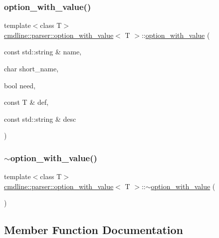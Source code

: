 \subsubsection{\texorpdfstring{option\_with\_value()}{option\_with\_value()}}
{\footnotesize\ttfamily template$<$class T$>$ \\
\mbox{\hyperlink{classcmdline_1_1parser_1_1option__with__value}{cmdline\+::parser\+::option\+\_\+with\+\_\+value}}$<$ T $>$\+::\mbox{\hyperlink{classcmdline_1_1parser_1_1option__with__value}{option\+\_\+with\+\_\+value}} (\begin{DoxyParamCaption}\item[{const std\+::string \&}]{name,  }\item[{char}]{short\+\_\+name,  }\item[{bool}]{need,  }\item[{const T \&}]{def,  }\item[{const std\+::string \&}]{desc }\end{DoxyParamCaption})\hspace{0.3cm}{\ttfamily [inline]}}

\mbox{\label{classcmdline_1_1parser_1_1option__with__value_a58b664530840bd743fc559cf84b93b9d}} 
\subsubsection{\texorpdfstring{$\sim$option\_with\_value()}{~option\_with\_value()}}
{\footnotesize\ttfamily template$<$class T$>$ \\
\mbox{\hyperlink{classcmdline_1_1parser_1_1option__with__value}{cmdline\+::parser\+::option\+\_\+with\+\_\+value}}$<$ T $>$\+::$\sim$\mbox{\hyperlink{classcmdline_1_1parser_1_1option__with__value}{option\+\_\+with\+\_\+value}} (\begin{DoxyParamCaption}{ }\end{DoxyParamCaption})\hspace{0.3cm}{\ttfamily [inline]}}



\subsection{Member Function Documentation}
\mbox{\label{classcmdline_1_1parser_1_1option__with__value_ac430403324ef502009880473a5d4c945}} 
